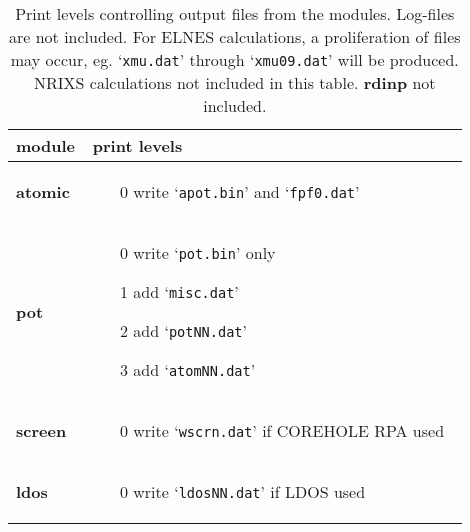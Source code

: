 \documentclass[11pt,oneside]{report} %
\newcommand{\file}[1]{`\texttt{#1}'}
\newcommand{\module}[1]{\textrm{\bf{#1}}}
\begin{document}
\begin{latexonly}
\newpage

\begin{table}[htbp] \label{table:printlevels}
    \caption[Print levels]{Print levels controlling output files from the modules.  Log-files are not included.
      For ELNES calculations, a proliferation of files may occur, eg. \file{xmu.dat} through \file{xmu09.dat} will be produced.
      NRIXS calculations not included in this table. \module{rdinp} not included.}
    \begin{center}
    \begin{tabular}[h]{p{0.1\linewidth}p{0.8\linewidth}}
          \hline\hline
      module & \hspace{5em} print levels\\
      \hline
      \module{atomic} &
      \vspace{-4ex}
      \begin{itemize}
        \tightlist
      \item[0] write \file{apot.bin} and \file{fpf0.dat}
      \end{itemize}\\
      \module{pot} &
      \vspace{-4ex}
      \begin{itemize}
        \tightlist
      \item[0] write \file{pot.bin} only
      \item[1] add \file{misc.dat}
      \item[2] add \file{potNN.dat}
      \item[3] add \file{atomNN.dat}
      \end{itemize}\\
      \module{screen} &
      \vspace{-4ex}
      \begin{itemize}
        \tightlist
      \item[0] write \file{wscrn.dat} if COREHOLE RPA used
      \end{itemize}\\
      \module{ldos} &
      \vspace{-4ex}
      \begin{itemize}
        \tightlist
      \item[0] write \file{ldosNN.dat} if LDOS used
      \end{itemize}\\

\end{tabular}
\end{center}
\end{table}
\end{latexonly}
\end{document}
